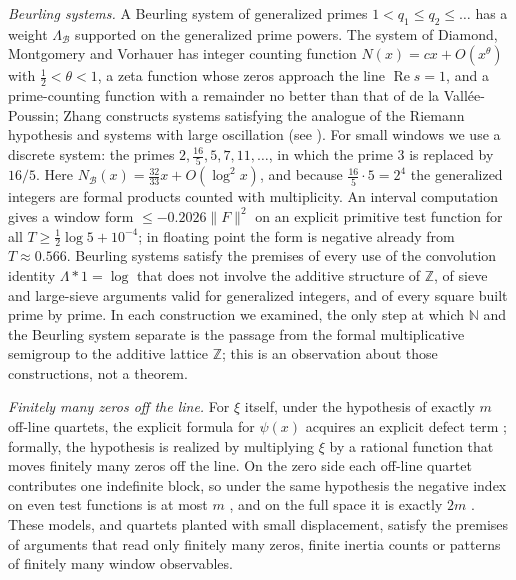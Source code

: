 \documentclass[11pt]{amsart}
\theoremstyle{definition}
\theoremstyle{remark}
\numberwithin{equation}{section}
\newcommand{\N}{\mathbb{N}}
\newcommand{\Z}{\mathbb{Z}}
\DeclareMathOperator{\Rel}{Re}
\begin{document}
\emph{Beurling systems.} A Beurling system of generalized primes $1<q_1\le q_2\le\dots$ has a weight
$\Lambda_{\mathcal B}$ supported on the generalized prime powers. The system of Diamond,
Montgomery and Vorhauer \cite{DMV2006} has integer counting function $N(x)=cx+O(x^\theta)$ with $\frac12<\theta<1$,
a zeta function whose zeros approach the line $\Rel s=1$, and a prime-counting function with a remainder no better
than that of de la Vall\'ee-Poussin; Zhang \cite{Zhang2007} constructs systems satisfying the analogue of the Riemann
hypothesis and systems with large oscillation (see \cite{DiamondZhang2016,BDR2023}). For small windows we use a
discrete system: the primes $2,\frac{16}{5},5,7,11,\dots$, in which the prime $3$ is replaced by $16/5$. Here
$N_{\mathcal B}(x)=\frac{32}{33}x+O(\log^2x)$, and because $\frac{16}{5}\cdot5=2^4$ the generalized integers are
formal products counted with multiplicity. An interval computation gives a window form
$\le-0.2026\|F\|^2$ on an explicit primitive test function for all $T\ge\frac12\log5+10^{-4}$; in floating point the
form is negative already from $T\approx0.566$. Beurling systems satisfy the premises of every use of the convolution
identity $\Lambda\ast1=\log$ that does not involve the additive structure of $\Z$, of sieve and large-sieve arguments
valid for generalized integers, and of every square built prime by prime. In each construction we examined, the only
step at which $\N$ and the Beurling system separate is the passage from the formal multiplicative semigroup to the
additive lattice $\Z$; this is an observation about those constructions, not a theorem.

\emph{Finitely many zeros off the line.} For $\xi$ itself, under the hypothesis of exactly $m$ off-line quartets,
the explicit formula for $\psi(x)$ acquires an explicit defect term \cite[Theorem~3.3]{P19}; formally, the
hypothesis is realized by multiplying $\xi$ by a rational function that moves finitely many zeros off the line. On
the zero side each off-line quartet contributes one indefinite block, so under the same hypothesis the negative
index on even test functions is at most $m$ \cite[Corollary~6.5]{P18}, and on the full space it is exactly $2m$
\cite[Proposition~4.7]{P25}. These models, and quartets planted with small displacement, satisfy the premises of
arguments that read only finitely many zeros, finite inertia counts or patterns of finitely many window
observables.
\end{document}
